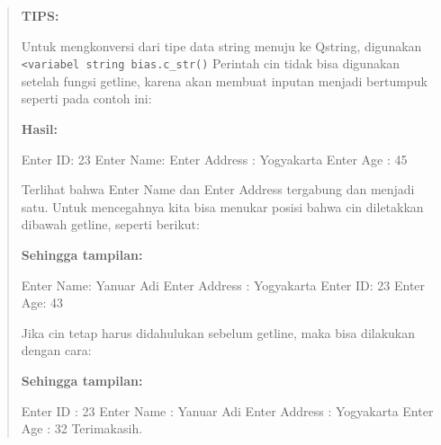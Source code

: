 \begin{quotation}

{\LARGE {}} \textbf{TIPS:} 

Untuk
mengkonversi dari tipe data string menuju ke Qstring, digunakan
\texttt{\textless{}variabel\ string\ bias.c\_str()} Perintah cin tidak
bisa digunakan setelah fungsi getline, karena akan membuat inputan
menjadi bertumpuk seperti pada contoh ini:



\textbf{Hasil:}

\begin{lcverbatim}
Enter ID: 23
Enter Name: Enter Address : Yogyakarta
Enter Age : 45
\end{lcverbatim}

Terlihat bahwa Enter Name dan Enter Address tergabung dan menjadi satu.
Untuk mencegahnya kita bisa menukar posisi bahwa cin diletakkan dibawah
getline, seperti berikut:



\textbf{Sehingga tampilan:}

\begin{lcverbatim}
Enter Name: Yanuar Adi
Enter Address : Yogyakarta
Enter ID: 23
Enter Age: 43
\end{lcverbatim}

Jika cin tetap harus didahulukan sebelum getline, maka bisa dilakukan
dengan cara:



\textbf{Sehingga tampilan:}

\begin{lcverbatim}
Enter ID : 23
Enter Name : Yanuar Adi
Enter Address : Yogyakarta
Enter Age : 32
Terimakasih.
\end{lcverbatim}
\end{quotation}

